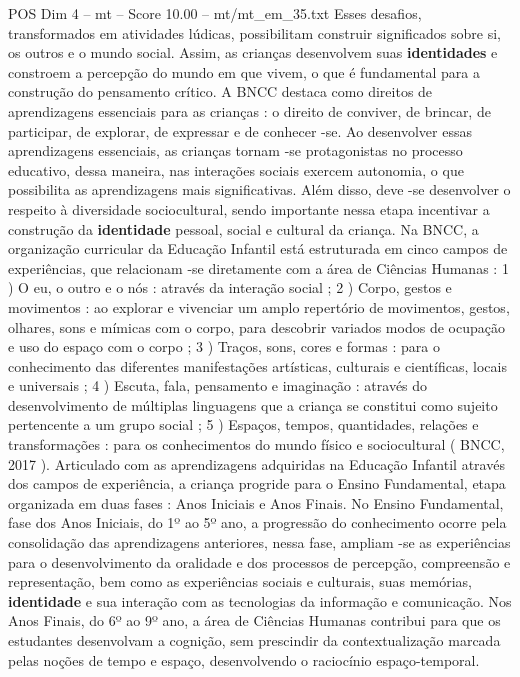 \begin{textsample}{POS Dim 4 – mt – Score 10.00 – mt/mt\_em\_35.txt}
Esses desafios, transformados em atividades lúdicas, possibilitam construir significados sobre si, os outros e o mundo social.
Assim, as crianças desenvolvem suas \textbf{identidades} e constroem a percepção do mundo em que vivem, o que é fundamental para a construção do pensamento crítico.
A BNCC destaca como direitos de aprendizagens essenciais para as crianças : o direito de conviver, de brincar, de participar, de explorar, de expressar e de conhecer -se.
Ao desenvolver essas aprendizagens essenciais, as crianças tornam -se protagonistas no processo educativo, dessa maneira, nas interações sociais exercem autonomia, o que possibilita as aprendizagens mais significativas.
Além disso, deve -se desenvolver o respeito à diversidade sociocultural, sendo importante nessa etapa incentivar a construção da \textbf{identidade} pessoal, social e cultural da criança.
Na BNCC, a organização curricular da Educação Infantil está estruturada em cinco campos de experiências, que relacionam -se diretamente com a área de Ciências Humanas : 1 ) O eu, o outro e o nós : através da interação social ; 2 ) Corpo, gestos e movimentos : ao explorar e vivenciar um amplo repertório de movimentos, gestos, olhares, sons e mímicas com o corpo, para descobrir variados modos de ocupação e uso do espaço com o corpo ; 3 ) Traços, sons, cores e formas : para o conhecimento das diferentes manifestações artísticas, culturais e científicas, locais e universais ; 4 ) Escuta, fala, pensamento e imaginação : através do desenvolvimento de múltiplas linguagens que a criança se constitui como sujeito pertencente a um grupo social ; 5 ) Espaços, tempos, quantidades, relações e transformações : para os conhecimentos do mundo físico e sociocultural ( BNCC, 2017 ).
Articulado com as aprendizagens adquiridas na Educação Infantil através dos campos de experiência, a criança progride para o Ensino Fundamental, etapa organizada em duas fases : Anos Iniciais e Anos Finais.
No Ensino Fundamental, fase dos Anos Iniciais, do 1º ao 5º ano, a progressão do conhecimento ocorre pela consolidação das aprendizagens anteriores, nessa fase, ampliam -se as experiências para o desenvolvimento da oralidade e dos processos de percepção, compreensão e representação, bem como as experiências sociais e culturais, suas memórias, \textbf{identidade} e sua interação com as tecnologias da informação e comunicação.
Nos Anos Finais, do 6º ao 9º ano, a área de Ciências Humanas contribui para que os estudantes desenvolvam a cognição, sem prescindir da contextualização marcada pelas noções de tempo e espaço, desenvolvendo o raciocínio espaço-temporal.

\end{textsample}

